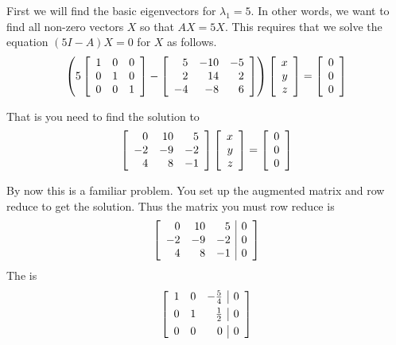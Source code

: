 \begin{solution}
First we will find the basic eigenvectors for $\lambda_1 =5.$ In other
words, we want to find all non-zero vectors $X$ so that $AX =
5X$. This requires that we solve the equation $\left( 5 I - A 
\right) X = 0$ for $X$ as follows.
\begin{equation*}
\left( 5\left[
\begin{array}{rrr}
1 & 0 & 0 \\
0 & 1 & 0 \\
0 & 0 & 1
\end{array}
\right] -  \left[ 
\begin{array}{rrr}
5 & -10 & -5 \\
2 & 14 & 2 \\
-4 & -8 & 6
\end{array}
\right]  \right) \left[
\begin{array}{r}
x \\
y \\
z
\end{array}
\right] =\left[
\begin{array}{r}
0 \\
0 \\
0
\end{array}
\right] 
\end{equation*}

That is you need to find the solution to
\begin{equation*}
\allowbreak \left[
\begin{array}{rrr}
0 & 10 & 5 \\
-2 & -9 & -2 \\
4 & 8 & -1
\end{array}
\right] \left[
\begin{array}{r}
x \\
y \\
z
\end{array}
\right] =\left[
\begin{array}{r}
0 \\
0 \\
0
\end{array}
\right]
\end{equation*}

By now this is a familiar problem. You set up the augmented matrix and row
reduce to get the solution. Thus the matrix you must row reduce is
\begin{equation*}
\left[
\begin{array}{rrr|r}
 0 & 10 & 5 & 0 \\
 -2 &  -9  &  -2 & 0 \\
4 & 8  &  -1 & 0
\end{array}
\right]  
\end{equation*}
The {\rref} is
\begin{equation*}
\leftB
\begin{array}{rrr|r}
1 & 0 & -
\vspace{0.05in}\frac{5}{4} & 0 \\
0 & 1 & \vspace{0.05in}\frac{1}{2} & 0 \\
0 & 0 & 0 & 0
\end{array}
\rightB
\end{equation*}


\end{solution}
